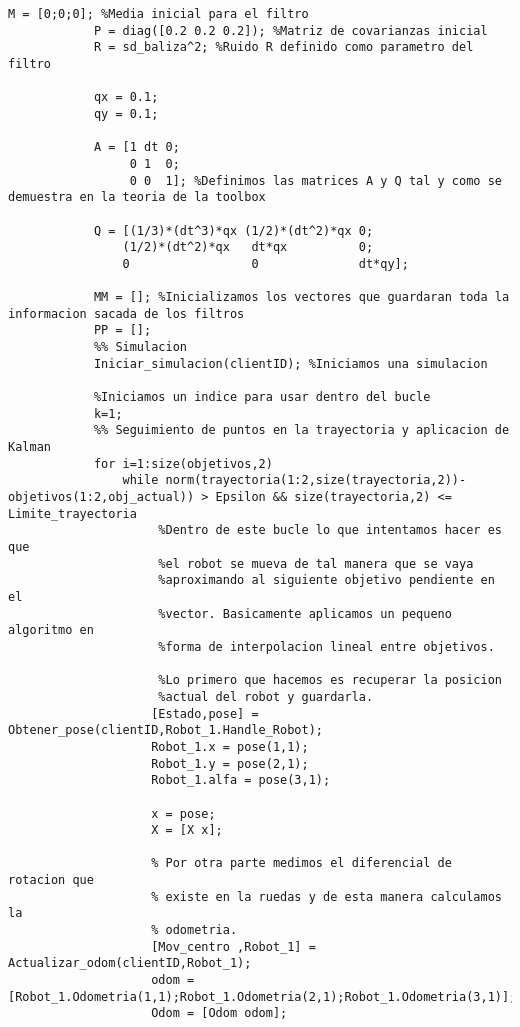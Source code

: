 \begin{lstlisting}[frame=single]
            M = [0;0;0]; %Media inicial para el filtro
            P = diag([0.2 0.2 0.2]); %Matriz de covarianzas inicial
            R = sd_baliza^2; %Ruido R definido como parametro del filtro 

            qx = 0.1;
            qy = 0.1;

            A = [1 dt 0;
                 0 1  0;
                 0 0  1]; %Definimos las matrices A y Q tal y como se demuestra en la teoria de la toolbox

            Q = [(1/3)*(dt^3)*qx (1/2)*(dt^2)*qx 0;
                (1/2)*(dt^2)*qx   dt*qx          0;
                0                 0              dt*qy];

            MM = []; %Inicializamos los vectores que guardaran toda la informacion sacada de los filtros
            PP = [];
            %% Simulacion
            Iniciar_simulacion(clientID); %Iniciamos una simulacion 

            %Iniciamos un indice para usar dentro del bucle
            k=1;
            %% Seguimiento de puntos en la trayectoria y aplicacion de Kalman
            for i=1:size(objetivos,2)
                while norm(trayectoria(1:2,size(trayectoria,2))-objetivos(1:2,obj_actual)) > Epsilon && size(trayectoria,2) <= Limite_trayectoria
                     %Dentro de este bucle lo que intentamos hacer es que
                     %el robot se mueva de tal manera que se vaya
                     %aproximando al siguiente objetivo pendiente en el
                     %vector. Basicamente aplicamos un pequeno algoritmo en
                     %forma de interpolacion lineal entre objetivos.
                     
                     %Lo primero que hacemos es recuperar la posicion
                     %actual del robot y guardarla.
                    [Estado,pose] = Obtener_pose(clientID,Robot_1.Handle_Robot);
                    Robot_1.x = pose(1,1);
                    Robot_1.y = pose(2,1);
                    Robot_1.alfa = pose(3,1);
                   
                    x = pose;
                    X = [X x];
                    
                    % Por otra parte medimos el diferencial de rotacion que
                    % existe en la ruedas y de esta manera calculamos la
                    % odometria.
                    [Mov_centro ,Robot_1] = Actualizar_odom(clientID,Robot_1);
                    odom = [Robot_1.Odometria(1,1);Robot_1.Odometria(2,1);Robot_1.Odometria(3,1)];
                    Odom = [Odom odom];
     

\end{lstlisting}
